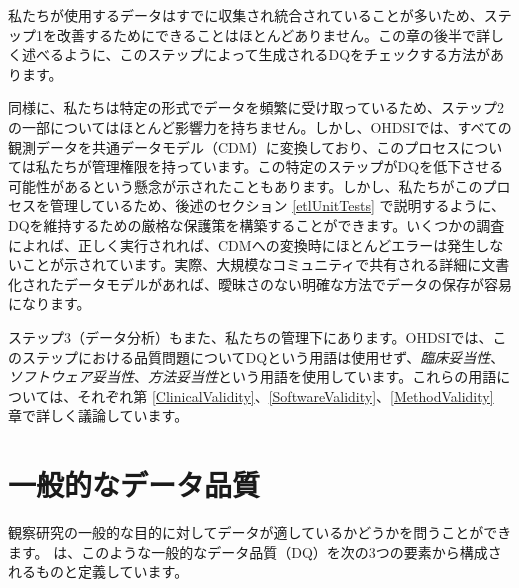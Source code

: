\documentclass[
  11pt]{book}
\theoremstyle{definition}
\theoremstyle{definition}
\theoremstyle{definition}
\theoremstyle{definition}
\theoremstyle{remark}
\begin{document}
私たちが使用するデータはすでに収集され統合されていることが多いため、ステップ1を改善するためにできることはほとんどありません。この章の後半で詳しく述べるように、このステップによって生成されるDQをチェックする方法があります。

同様に、私たちは特定の形式でデータを頻繁に受け取っているため、ステップ2の一部についてはほとんど影響力を持ちません。しかし、OHDSIでは、すべての観測データを共通データモデル（CDM）に変換しており、このプロセスについては私たちが管理権限を持っています。この特定のステップがDQを低下させる可能性があるという懸念が示されたこともあります。しかし、私たちがこのプロセスを管理しているため、後述のセクション \ref{etlUnitTests} で説明するように、DQを維持するための厳格な保護策を構築することができます。いくつかの調査 \citep{defalco_2013, makadia_2014, matcho_2014, voss_2015, voss_2015b, hripcsak_2018} によれば、正しく実行されれば、CDMへの変換時にほとんどエラーは発生しないことが示されています。実際、大規模なコミュニティで共有される詳細に文書化されたデータモデルがあれば、曖昧さのない明確な方法でデータの保存が容易になります。

ステップ3（データ分析）もまた、私たちの管理下にあります。OHDSIでは、このステップにおける品質問題についてDQという用語は使用せず、\emph{臨床妥当性}、\emph{ソフトウェア妥当性}、\emph{方法妥当性}という用語を使用しています。これらの用語については、それぞれ第 \ref{ClinicalValidity}、\ref{SoftwareValidity}、\ref{MethodValidity} 章で詳しく議論しています。

\section{一般的なデータ品質}\label{ux4e00ux822cux7684ux306aux30c7ux30fcux30bfux54c1ux8cea}

観察研究の一般的な目的に対してデータが適しているかどうかを問うことができます。\citet{kahn_harmonized_2016} は、このような一般的なデータ品質（DQ）を次の3つの要素から構成されるものと定義しています。
\end{document}
